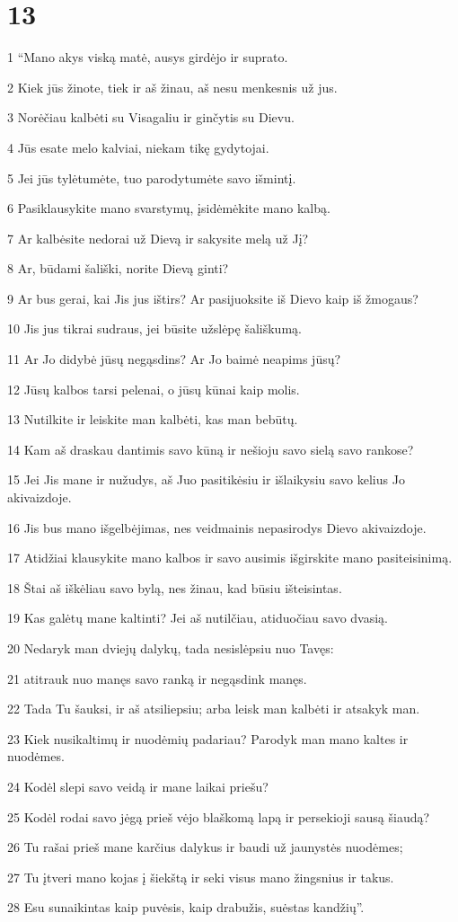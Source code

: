 \chapter{13}


\par 1 “Mano akys viską matė, ausys girdėjo ir suprato. 
\par 2 Kiek jūs žinote, tiek ir aš žinau, aš nesu menkesnis už jus. 
\par 3 Norėčiau kalbėti su Visagaliu ir ginčytis su Dievu. 
\par 4 Jūs esate melo kalviai, niekam tikę gydytojai. 
\par 5 Jei jūs tylėtumėte, tuo parodytumėte savo išmintį. 
\par 6 Pasiklausykite mano svarstymų, įsidėmėkite mano kalbą. 
\par 7 Ar kalbėsite nedorai už Dievą ir sakysite melą už Jį? 
\par 8 Ar, būdami šališki, norite Dievą ginti? 
\par 9 Ar bus gerai, kai Jis jus ištirs? Ar pasijuoksite iš Dievo kaip iš žmogaus? 
\par 10 Jis jus tikrai sudraus, jei būsite užslėpę šališkumą. 
\par 11 Ar Jo didybė jūsų negąsdins? Ar Jo baimė neapims jūsų? 
\par 12 Jūsų kalbos tarsi pelenai, o jūsų kūnai kaip molis. 
\par 13 Nutilkite ir leiskite man kalbėti, kas man bebūtų. 
\par 14 Kam aš draskau dantimis savo kūną ir nešioju savo sielą savo rankose? 
\par 15 Jei Jis mane ir nužudys, aš Juo pasitikėsiu ir išlaikysiu savo kelius Jo akivaizdoje. 
\par 16 Jis bus mano išgelbėjimas, nes veidmainis nepasirodys Dievo akivaizdoje. 
\par 17 Atidžiai klausykite mano kalbos ir savo ausimis išgirskite mano pasiteisinimą. 
\par 18 Štai aš iškėliau savo bylą, nes žinau, kad būsiu išteisintas. 
\par 19 Kas galėtų mane kaltinti? Jei aš nutilčiau, atiduočiau savo dvasią. 
\par 20 Nedaryk man dviejų dalykų, tada nesislėpsiu nuo Tavęs: 
\par 21 atitrauk nuo manęs savo ranką ir negąsdink manęs. 
\par 22 Tada Tu šauksi, ir aš atsiliepsiu; arba leisk man kalbėti ir atsakyk man. 
\par 23 Kiek nusikaltimų ir nuodėmių padariau? Parodyk man mano kaltes ir nuodėmes. 
\par 24 Kodėl slepi savo veidą ir mane laikai priešu? 
\par 25 Kodėl rodai savo jėgą prieš vėjo blaškomą lapą ir persekioji sausą šiaudą? 
\par 26 Tu rašai prieš mane karčius dalykus ir baudi už jaunystės nuodėmes; 
\par 27 Tu įtveri mano kojas į šiekštą ir seki visus mano žingsnius ir takus. 
\par 28 Esu sunaikintas kaip puvėsis, kaip drabužis, suėstas kandžių”.




